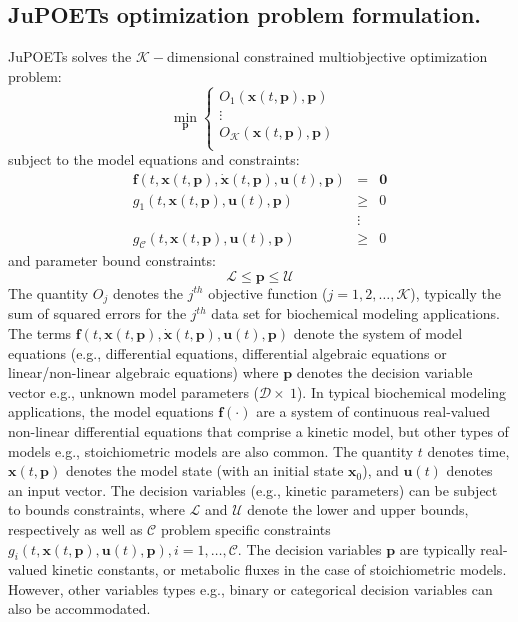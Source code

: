 \documentclass{bmcart}
\begin{document}
\subsection*{JuPOETs optimization problem formulation.}
JuPOETs solves the $\mathcal{K}-$dimensional constrained multiobjective optimization problem:
\begin{equation}
\min_{\mathbf{p}}
\begin{cases}
  O_{1}\left(\mathbf{x}(t,\mathbf{p}),\mathbf{p}\right) \\
  \vdots & \\
  O_{\mathcal{K}}\left(\mathbf{x}(t,\mathbf{p}),\mathbf{p}\right) \\
\end{cases}
\end{equation}
subject to the model equations and constraints:
\begin{eqnarray}\nonumber
  \mathbf{f}(t,\mathbf{x}(t,\mathbf{p}),\dot{\mathbf{x}}(t,\mathbf{p}),\mathbf{u}(t),\mathbf{p}) &=&\mathbf{0} \\\nonumber
  g_{1}\left(t,\mathbf{x}(t,\mathbf{p}),\mathbf{u}(t),\mathbf{p}\right) &\geq& 0 \\\nonumber
  &\vdots& \\\nonumber
  g_{\mathcal{C}}\left(t,\mathbf{x}(t,\mathbf{p}),\mathbf{u}(t),\mathbf{p}\right) &\geq& 0
\end{eqnarray}and parameter bound constraints:
\begin{equation}\nonumber
  \mathcal{L} \leq \mathbf{p} \leq \mathcal{U}
\end{equation}
The quantity $O_{j}$ denotes the $j^{th}$ objective function ($j=1,2,\hdots,\mathcal{K}$), typically the sum of squared errors for the $j^{th}$ data set for biochemical modeling applications.
The terms $\mathbf{f}(t,\mathbf{x}(t,\mathbf{p}),\dot{\mathbf{x}}(t,\mathbf{p}),\mathbf{u}(t),\mathbf{p})$ denote the system of model equations (e.g., differential equations,
differential algebraic equations or linear/non-linear algebraic equations) where $\mathbf{p}$ denotes the decision variable vector e.g., unknown model parameters ($\mathcal{D}\times~1$).
In typical biochemical modeling applications, the model equations $\mathbf{f}\left(\cdot\right)$
are a system of continuous real-valued non-linear differential equations that comprise a kinetic model, but other types of models e.g., stoichiometric models are also common.
The quantity $t$ denotes time, $\mathbf{x}\left(t,\mathbf{p}\right)$ denotes the model state (with an initial state $\mathbf{x}_{0}$), and $\mathbf{u}(t)$ denotes an input vector.
The decision variables (e.g., kinetic parameters) can be subject to bounds constraints, where $\mathcal{L}$ and $\mathcal{U}$ denote the lower and upper bounds, respectively
as well as $\mathcal{C}$ problem specific constraints $g_i\left(t,\mathbf{x}(t,\mathbf{p}),\mathbf{u}(t),\mathbf{p}\right),i=1,\hdots,\mathcal{C}$.
The decision variables $\mathbf{p}$ are typically real-valued kinetic constants, or metabolic fluxes in the case of stoichiometric models.
However, other variables types e.g., binary or categorical decision variables can also be accommodated.
\end{document}

